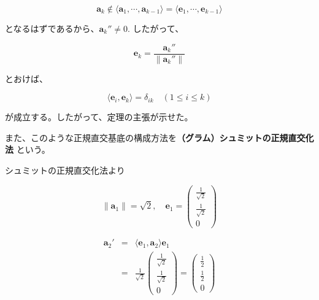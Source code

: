 \documentclass[dvipdfmx,autodetect-engine]{jsarticle}
\begin{document}
$$
\bm{a}_k \notin \langle \bm{a}_1, \cdots, \bm{a}_{k-1} \rangle = \langle \bm{e}_1, \cdots, \bm{e}_{k-1} \rangle
$$

となるはずであるから、$\bm{a}_k'' \neq 0$. したがって、

$$
\bm{e}_k = \frac{\bm{a}_k''}{\|\bm{a}_k''\|}
$$

とおけば、

$$
\langle \bm{e}_i, \bm{e}_k \rangle = \delta_{ik} \quad (1 \leq i \leq k)
$$

が成立する。したがって、定理の主張が示せた。

また、このような正規直交基底の構成方法を{\bf（グラム）シュミットの正規直交化法 }という。
{\bf \newline}







シュミットの正規直交化法より

$$
\|\bm{a}_1\| = \sqrt{2}, \quad \bm{e}_1 = \begin{pmatrix}
\frac{1}{\sqrt{2}} \\[1.5ex]
\frac{1}{\sqrt{2}} \\[1.5ex]
0
\end{pmatrix}
$$

\begin{eqnarray*}
\bm{a}_2' &= &\langle \bm{e}_1, \bm{a}_2 \rangle \bm{e}_1 \\[1.5ex]
&=& \frac{1}{\sqrt{2}} \begin{pmatrix}
\frac{1}{\sqrt{2}} \\[1.5ex]
\frac{1}{\sqrt{2}} \\[1.5ex]
0
\end{pmatrix} = \begin{pmatrix}
\frac{1}{2}  \\[1.5ex]
\frac{1}{2}  \\[1.5ex]
0
\end{pmatrix}
\end{eqnarray*}
\end{document}
